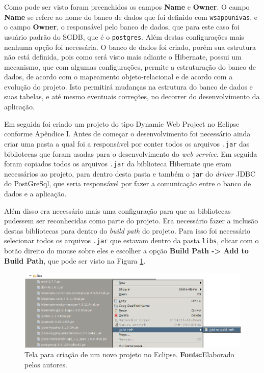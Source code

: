 	\par Como pode ser visto foram preenchidos os campos \textbf{Name} e
\textbf{Owner}. O campo \textbf{Name} se refere ao nome do banco de dados que
foi definido com \texttt{wsappunivas}, e o campo \textbf{Owner}, o responsável
pelo banco de dados, que para este caso foi usuário padrão do SGDB, que é o
\texttt{postgres}. Além destas configurações mais nenhuma opção foi necessária.
O banco de dados foi criado, porém sua estrutura não está definida, pois como
será visto mais adiante o Hibernate, possui um mecanismo, que com algumas
configurações, permite a estruturação do banco de dados, de acordo com o
mapeamento objeto-relacional e de acordo com a evolução do projeto. Isto
permitirá mudanças na estrutura do banco de dados e suas tabelas, e até mesmo
eventuais correções, no decorrer do desenvolvimento da aplicação.
	
	\par Em seguida foi criado um projeto do tipo Dynamic Web Project no
Eclipse conforme Apêndice I. Antes de começar o desenvolvimento foi necessário
ainda criar uma pasta a qual foi a responsável por conter todos os arquivos
\texttt{.jar} das bibliotecas que foram usadas para o desenvolvimento do
\textit{web service}. Em seguida foram copiados todos os arquivos \texttt{.jar}
da biblioteca Hibernate que eram necessários ao projeto, para dentro desta
pasta e também o \texttt{jar} do \textit{driver} JDBC do PostGreSql, que seria
responsável por fazer a comunicação entre o banco de dados e a aplicação.
	
	\par Além disso era necessário mais uma configuração para que as bibliotecas
pudessem ser reconhecidas como parte do projeto. Era necessário fazer a
inclusão destas bibliotecas para dentro do \textit{build path} do projeto. Para
isso foi necessário selecionar todos os arquivos \texttt{.jar} que estavam
dentro da pasta \texttt{libs}, clicar com o botão direito do mouse sobre eles e
escolher a opção \textbf{Build Path -> Add to Build Path}, que pode ser visto
na Figura \ref{fig:desws6_3}.

	\begin{figure}[h!]
		\centerline{\includegraphics[scale=0.60]{./imagens/2_q_metodologico/4_procedimentos_resultados/43_webservice/432_desenvolvimento/desws6_3.png}}
		\caption[Tela para criação de um novo projeto no Eclipse]{Tela para criação de um novo projeto no Eclipse.
			\textbf{Fonte:}Elaborado pelos autores.}
		\label{fig:desws6_3}
	\end{figure}
	
